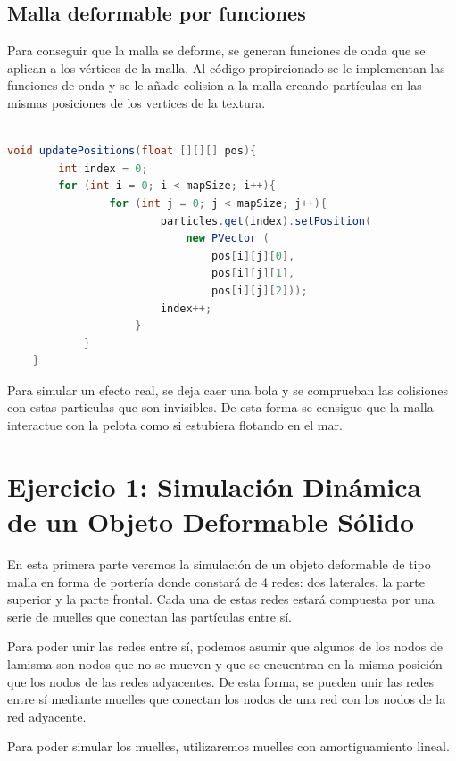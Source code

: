 \documentclass{article}
\begin{document}
\subsection{Malla deformable por funciones}\label{sec:malla-funcion}

Para conseguir que la malla se deforme, se generan funciones de onda que se aplican a los vértices de la malla. Al código propircionado se le implementan las funciones de onda y se le añade colision a la malla creando partículas en las mismas posiciones de los vertices de la textura.

\begin{lstlisting}[language=Java, frame=single]

void updatePositions(float [][][] pos){
        int index = 0;
        for (int i = 0; i < mapSize; i++){
                for (int j = 0; j < mapSize; j++){
                        particles.get(index).setPosition(
                            new PVector (
                                pos[i][j][0], 
                                pos[i][j][1], 
                                pos[i][j][2]));
                        index++;
                    }
            }
    }
\end{lstlisting}

Para simular un efecto real, se deja caer una bola y se comprueban las colisiones con estas particulas que son invisibles. De esta forma se consigue que la malla interactue con la pelota como si estubiera flotando en el mar.

\section{Ejercicio 1: Simulación Dinámica de un Objeto Deformable Sólido}\label{sec:ejercicio1}

En esta primera parte veremos la simulación de un objeto deformable de tipo malla en forma de portería donde constará de 
4 redes: dos laterales, la parte superior y la parte frontal. Cada una de estas redes estará compuesta por una serie de muelles que conectan las partículas entre sí.

Para poder unir las redes entre sí, podemos asumir que algunos de los nodos de lamisma son nodos que no se mueven y que se encuentran en la misma posición que los nodos de las redes adyacentes. 
De esta forma, se pueden unir las redes entre sí mediante muelles que conectan los nodos de una red con los nodos de la red adyacente.

Para poder simular los muelles, utilizaremos muelles con amortiguamiento lineal.
\end{document}

